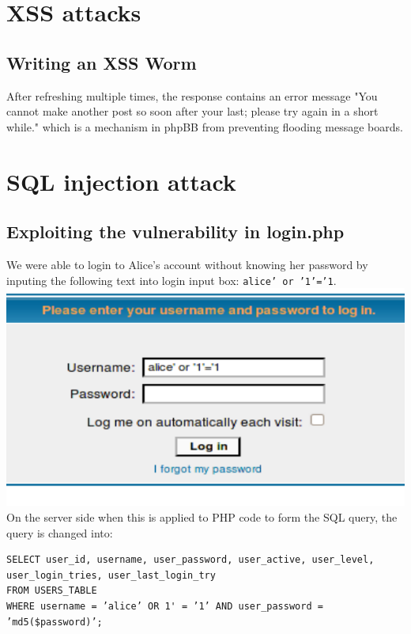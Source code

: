 \documentclass[12pt, a4paper, pdflatex]{article}
\begin{document}
\section{XSS attacks}

\subsection{Writing an XSS Worm}

After refreshing multiple times, the response contains an error message "You cannot make another post so soon after your last; please try again in a short while." which is a mechanism in phpBB from preventing flooding message boards.


\section{SQL injection attack}

\subsection{Exploiting the vulnerability in login.php}

We were able to login to Alice's account without knowing her password by inputing the following
text into login input box: \texttt{alice' or '1'='1}.\\
\includegraphics[width=.95\textwidth]{gfx/sql/login.png}\\ On the server side when this is applied
to PHP code to form the SQL query, the query is changed into:

\lstset{
  captionpos=b,
  frame=single,
  language=SQL,
  breaklines=true,
  label=sql1
}
\begin{lstlisting}
SELECT user_id, username, user_password, user_active, user_level,
user_login_tries, user_last_login_try
FROM USERS_TABLE
WHERE username = ’alice’ OR 1' = ’1’ AND user_password = ’md5($password)’;
\end{lstlisting}
\end{document}
